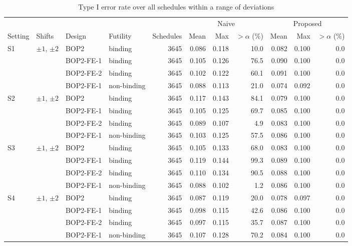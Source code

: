 \begin{table}
\centering
\caption{Type I error rate over all schedules within a range of deviations}
\label{tab:exhaustive}
\scriptsize
\setlength{\tabcolsep}{3pt}
\begin{tabular}{llllrrrrrrr}
\toprule
 & & & & & \multicolumn{3}{c}{Naive} & \multicolumn{3}{c}{Proposed} \\
\cmidrule(lr){6-8}\cmidrule(lr){9-11}
Setting & Shifts & Design & Futility & Schedules & Mean & Max & $>\alpha$ (\%) & Mean & Max & $>\alpha$ (\%) \\
\midrule
S1 & $\pm 1$, $\pm 2$ & BOP2 & binding & 3645 & 0.086 & 0.118 & 10.0 & 0.082 & 0.100 & 0.0 \\
 &  & BOP2-FE-1 & binding & 3645 & 0.105 & 0.126 & 76.5 & 0.090 & 0.100 & 0.0 \\
 &  & BOP2-FE-2 & binding & 3645 & 0.102 & 0.122 & 60.1 & 0.091 & 0.100 & 0.0 \\
 &  & BOP2-FE-1 & non-binding & 3645 & 0.088 & 0.113 & 21.0 & 0.074 & 0.092 & 0.0 \\
\midrule
S2 & $\pm 1$, $\pm 2$ & BOP2 & binding & 3645 & 0.117 & 0.143 & 84.1 & 0.079 & 0.100 & 0.0 \\
 &  & BOP2-FE-1 & binding & 3645 & 0.105 & 0.125 & 69.7 & 0.085 & 0.100 & 0.0 \\
 &  & BOP2-FE-2 & binding & 3645 & 0.089 & 0.107 & 4.9 & 0.083 & 0.100 & 0.0 \\
 &  & BOP2-FE-1 & non-binding & 3645 & 0.103 & 0.125 & 57.5 & 0.086 & 0.100 & 0.0 \\
\midrule
S3 & $\pm 1$, $\pm 2$ & BOP2 & binding & 3645 & 0.105 & 0.133 & 68.0 & 0.083 & 0.100 & 0.0 \\
 &  & BOP2-FE-1 & binding & 3645 & 0.119 & 0.144 & 99.3 & 0.089 & 0.100 & 0.0 \\
 &  & BOP2-FE-2 & binding & 3645 & 0.110 & 0.134 & 90.5 & 0.088 & 0.100 & 0.0 \\
 &  & BOP2-FE-1 & non-binding & 3645 & 0.088 & 0.102 & 1.2 & 0.086 & 0.100 & 0.0 \\
\midrule
S4 & $\pm 1$, $\pm 2$ & BOP2 & binding & 3645 & 0.087 & 0.119 & 20.0 & 0.078 & 0.097 & 0.0 \\
 &  & BOP2-FE-1 & binding & 3645 & 0.098 & 0.115 & 42.6 & 0.086 & 0.100 & 0.0 \\
 &  & BOP2-FE-2 & binding & 3645 & 0.097 & 0.115 & 35.7 & 0.087 & 0.100 & 0.0 \\
 &  & BOP2-FE-1 & non-binding & 3645 & 0.107 & 0.128 & 70.2 & 0.084 & 0.100 & 0.0 \\

\end{tabular}
\end{table}
